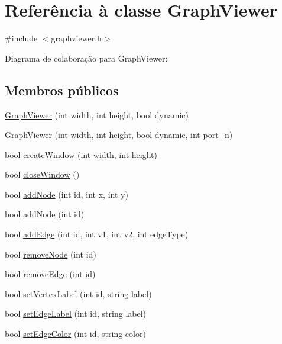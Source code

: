 \hypertarget{class_graph_viewer}{}\section{Referência à classe Graph\+Viewer}
\label{class_graph_viewer}


{\ttfamily \#include $<$graphviewer.\+h$>$}



Diagrama de colaboração para Graph\+Viewer\+:
\subsection*{Membros públicos}
\begin{DoxyCompactItemize}
\item 
\hyperlink{class_graph_viewer_a8adc614f4fc290a3efcec7d7ceb1c58a}{Graph\+Viewer} (int width, int height, bool dynamic)
\item 
\hyperlink{class_graph_viewer_ad9d7b1d8b4ba8ef18517eae0e68568a2}{Graph\+Viewer} (int width, int height, bool dynamic, int port\+\_\+n)
\item 
bool \hyperlink{class_graph_viewer_ae5247dc66449dcd21fc5d531bbbaddfa}{create\+Window} (int width, int height)
\item 
bool \hyperlink{class_graph_viewer_a85990c1eaac7feed3950960d4bd2fd4c}{close\+Window} ()
\item 
bool \hyperlink{class_graph_viewer_a5421e86ac76433876309236ba96e70a2}{add\+Node} (int id, int x, int y)
\item 
bool \hyperlink{class_graph_viewer_ab9be856eb5f45284719a3bb119ec01ea}{add\+Node} (int id)
\item 
bool \hyperlink{class_graph_viewer_aad0c1448c37f744209ffb671f1bd0015}{add\+Edge} (int id, int v1, int v2, int edge\+Type)
\item 
bool \hyperlink{class_graph_viewer_a0c418639bb911eb827cabf895915f775}{remove\+Node} (int id)
\item 
bool \hyperlink{class_graph_viewer_a9a8ee68c7c12b373affbe4069dd95d72}{remove\+Edge} (int id)
\item 
bool \hyperlink{class_graph_viewer_ac25d7d007022fda16799808ba136e909}{set\+Vertex\+Label} (int id, string label)
\item 
bool \hyperlink{class_graph_viewer_a447cca0064e785654c2105602c2961ca}{set\+Edge\+Label} (int id, string label)
\item 
bool \hyperlink{class_graph_viewer_a07ccc96707efae4aa5f3ced3dca015af}{set\+Edge\+Color} (int id, string color)

\end{DoxyCompactItemize}
